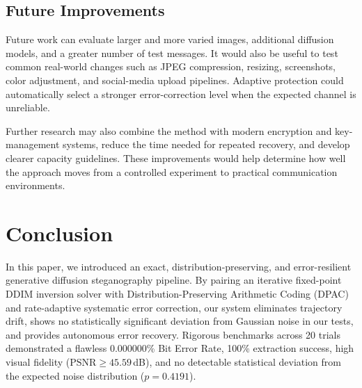 \documentclass[conference]{IEEEtran}
\begin{document}
\subsection{Future Improvements}
Future work can evaluate larger and more varied images, additional diffusion models, and a greater number of test messages. It would also be useful to test common real-world changes such as JPEG compression, resizing, screenshots, color adjustment, and social-media upload pipelines. Adaptive protection could automatically select a stronger error-correction level when the expected channel is unreliable.

Further research may also combine the method with modern encryption and key-management systems, reduce the time needed for repeated recovery, and develop clearer capacity guidelines. These improvements would help determine how well the approach moves from a controlled experiment to practical communication environments.

\section{Conclusion}
In this paper, we introduced an exact, distribution-preserving, and error-resilient generative diffusion steganography pipeline. By pairing an iterative fixed-point DDIM inversion solver with Distribution-Preserving Arithmetic Coding (DPAC) and rate-adaptive systematic error correction, our system eliminates trajectory drift, shows no statistically significant deviation from Gaussian noise in our tests, and provides autonomous error recovery. Rigorous benchmarks across 20 trials demonstrated a flawless 0.000000\% Bit Error Rate, 100\% extraction success, high visual fidelity ($\mathrm{PSNR} \ge 45.59$\,dB), and no detectable statistical deviation from the expected noise distribution ($p=0.4191$).



\end{document}
